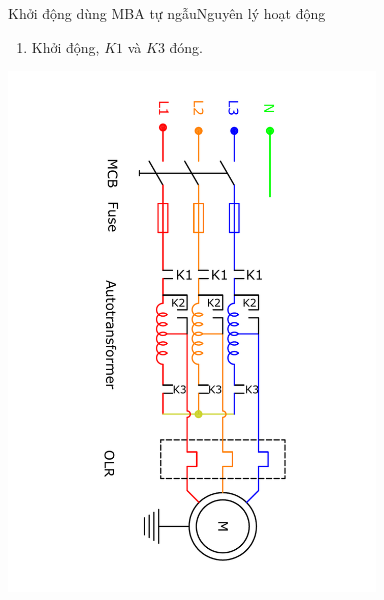\documentclass[17pt]{beamer}
\begin{document}
\begin{frame}{Khởi động dùng MBA tự ngẫu}{Nguyên lý hoạt động}
\begin{enumerate}
\item Khởi động, $K1$ và $K3$ đóng.
\end{enumerate}
\vspace{-2.5cm}
\begin{center}
\includegraphics[width = 0.73\textwidth,angle=90]{../sodomach/sodomach-bc-chude1-31.pdf}
\end{center}
\end{frame}
\end{document}
